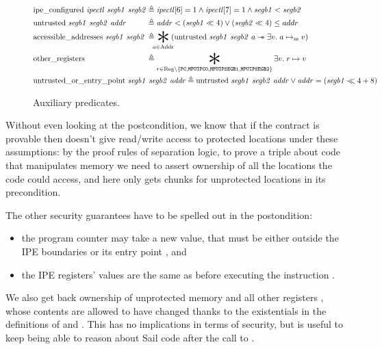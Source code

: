 \begin{figure}
  \centering
  \begin{align*}
    &\begin{alignedat}{2}
      &\pred{ipe\_configured}~\mathit{ipectl}~\mathit{segb1}~\mathit{segb2}
      &&\triangleq \mathit{ipectl}[6] = 1 \wedge \mathit{ipectl}[7] = 1 \wedge \mathit{segb1} < \mathit{segb2}
      \\
      &\pred{untrusted}~\mathit{segb1}~\mathit{segb2}~\mathit{addr}
      &&\triangleq \mathit{addr} < (\mathit{segb1} \ll 4) \vee (\mathit{segb2} \ll 4) \leq addr
      \\
      &\pred{accessible\_addresses}~\mathit{segb1}~\mathit{segb2}
      &&\triangleq \bigast_{\mathclap{a \in \pred{Addr}}}
         \left(\pred{untrusted}~\mathit{segb1}~\mathit{segb2}~a
         \wand \exists v.\; a \ptom v\right) \\
      &\pred{other\_registers}
      &&\triangleq \bigast_{r \in \pred{Reg} \setminus \left\{ \reg{PC}, \reg{MPUIPC0}, \reg{MPUIPSEGB1}, \reg{MPUIPSEGB2}\right\}} \exists v.\; r \ptor v
    \end{alignedat} \\
    &\begin{aligned}
      \pred{untrusted\_or\_entry\_point}~\mathit{segb1}~\mathit{segb2}~\mathit{addr} \triangleq {}
      \pred{untrusted}~\mathit{segb1}~\mathit{segb2}~\mathit{addr}
      \vee \mathit{addr} = (\mathit{segb1} \ll 4 + 8)
    \end{aligned}
  \end{align*}
  \caption{Auxiliary predicates.}
  \label{fig:aux-preds}
\end{figure}

Without even looking at the postcondition, we know that if the contract is provable then  doesn't give read/write access to protected locations under these assumptions: by the proof rules of separation logic, to prove a triple about code that manipulates memory we need to assert ownership of all the locations the code could access, and here  only gets chunks for unprotected locations in its precondition.

The other security guarantees have to be spelled out in the postondition:
\begin{itemize}
\item the program counter may take a new value, that must be either outside the IPE boundaries or its entry point , and
\item the IPE registers' values are the same as before executing the instruction .
\end{itemize}
We also get back ownership of unprotected memory and all other registers , whose contents are allowed to have changed thanks to the existentials in the definitions of  and . This has no implications in terms of security, but is useful to keep being able to reason about Sail code after the call to .

